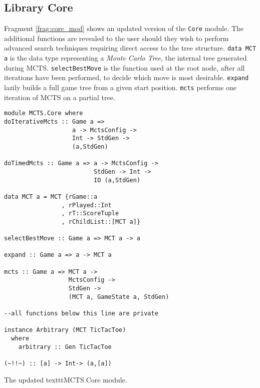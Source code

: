 \subsection{Library Core}
Fragment \ref{frag:core_mod} shows an updated version of the \texttt{Core} module. The additional functions are revealed to the user should they wish to perform advanced search techniques requiring direct access to the tree structure.
\texttt{data MCT a} is the data type representing a \textit{Monte Carlo Tree}, the internal tree generated during {MCTS}. \texttt{selectBestMove} is the function used at the root node, after all iterations have been performed, to decide which move is most desirable. \texttt{expand} lazily builds a full game tree from a given start position. \texttt{mcts} performs one iteration of {MCTS} on a partial tree.
\begin{fragment}
\begin{lstlisting}
module MCTS.Core where
doIterativeMcts :: Game a => 
                   a -> MctsConfig -> 
                   Int -> StdGen -> 
                   (a,StdGen)

doTimedMcts :: Game a => a -> MctsConfig -> 
                         StdGen -> Int -> 
                         IO (a,StdGen)

data MCT a = MCT {rGame::a
                , rPlayed::Int
                , rT::ScoreTuple
                , rChildList::[MCT a]}
                
selectBestMove :: Game a => MCT a -> a

expand :: Game a => a -> MCT a

mcts :: Game a => MCT a -> 
                  MctsConfig -> 
                  StdGen -> 
                  (MCT a, GameState a, StdGen)

--all functions below this line are private

instance Arbitrary (MCT TicTacToe)
  where
    arbitrary :: Gen TicTacToe
    
(~!!~) :: [a] -> Int-> (a,[a])
\end{lstlisting}
\caption{\label{frag:core_mod}The updated texttt{MCTS.Core} module.}
\end{fragment}

